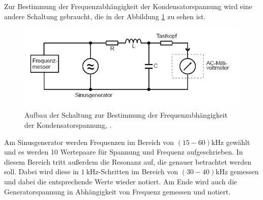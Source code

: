 Zur Bestimmung der Frequenzabhängigkeit der Kondensatorspannung wird eine andere Schaltung gebraucht, die in der Abbildung \ref{fig:frequenz} zu sehen ist. 
\begin{figure}[h!]
	\centering
	\includegraphics[width=0.7\linewidth]{frequenz.jpg}
	\caption{Aufbau der Schaltung zur Bestimmung der Frequenzabhängigkeit der Kondensatorspannung, \cite[12]{anleitung354}.}
	\label{fig:frequenz}
\end{figure}
Am Sinusgenerator werden Frequenzen im Bereich von $(15-60)\si{\kHz}$ gewählt und es werden 10 Wertepaare für Spannung und Frequenz aufgeschrieben. In diesem Bereich tritt außerdem die Resonanz auf, 
die genauer betrachtet werden soll. Dabei wird diese in $\SI{1}{\kHz}$-Schritten im Bereich von $(30-40)\si{\kHz}$ gemessen und dabei die entsprechende Werte wieder notiert.
Am Ende wird auch die Generatorspannung in Abhängigkeit von Frequenz gemessen und notiert.

